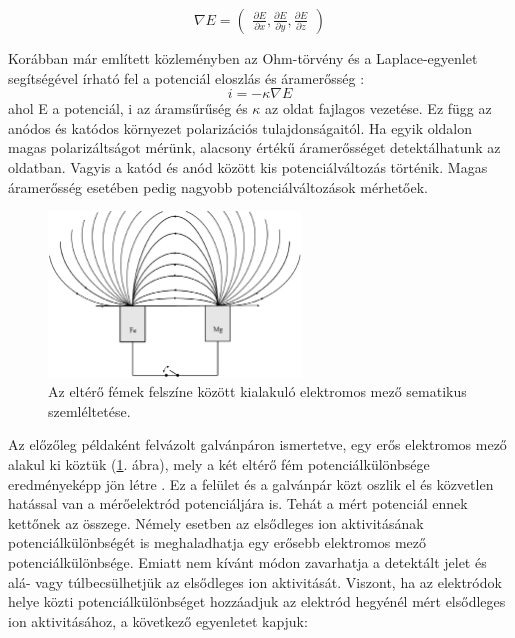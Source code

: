 \begin{equation}
{\nabla E=\left(\begin{matrix}
\frac{\partial E}{\partial x} , 
\frac{\partial E}{\partial y} ,
\frac{\partial E}{\partial z}
\end{matrix}\right)}
\label{eq:nabla}
\end{equation}

Korábban már említett közleményben az Ohm-törvény és a Laplace-egyenlet segítségével írható fel a potenciál eloszlás és áramerősség \cite{isaacs1981scanning}:
\begin{equation}
{i} = - \kappa \nabla E
\label{eq:field1}
\end{equation}
ahol E a potenciál, i az áramsűrűség és $\kappa$ az oldat fajlagos vezetése. Ez függ az anódos és katódos környezet polarizációs tulajdonságaitól. Ha egyik oldalon magas polarizáltságot mérünk, alacsony értékű áramerősséget detektálhatunk az oldatban. Vagyis a katód és anód között kis potenciálváltozás történik. Magas áramerősség esetében pedig nagyobb potenciálváltozások mérhetőek.

\begin{figure}
\centering
\includegraphics[width=0.6\textwidth]{img/field.eps}
\caption{Az eltérő fémek felszíne között kialakuló elektromos mező sematikus szemléltetése.}
\label{fig:field}
\end{figure}

Az előzőleg példaként felvázolt galvánpáron ismertetve, egy erős elektromos mező alakul ki köztük (\ref{fig:field}. ábra), mely a két eltérő fém potenciálkülönbsége eredményeképp jön létre \cite{kiss2017effect}. Ez a felület és a galvánpár közt oszlik el és közvetlen hatással van a mérőelektród potenciáljára is. Tehát a mért potenciál ennek kettőnek az összege. Némely esetben az elsődleges ion aktivitásának potenciálkülönbségét is meghaladhatja egy erősebb elektromos mező potenciálkülönbsége. Emiatt nem kívánt módon zavarhatja a detektált jelet és alá- vagy túlbecsülhetjük az elsődleges ion aktivitását. Viszont, ha az elektródok helye közti potenciálkülönbséget hozzáadjuk az elektród hegyénél mért elsődleges ion aktivitásához, a következő egyenletet kapjuk:

